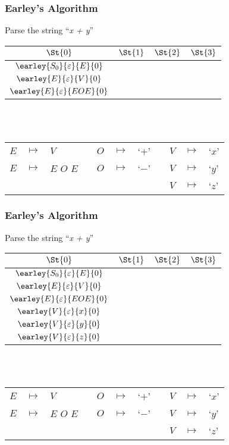 \begin{frame}
	\frametitle{Earley's Algorithm}
	\centering
	Parse the string ``\emph{x + y}''\\
	\vspace{0.5cm}
	\begin{tabular}{|c|c|c|c|}
		\hline
		$\St{0}$ & $\St{1}$ & $\St{2}$ & $\St{3}$ \\
		\hline
		$\earley{S_0}{\varepsilon}{E}{0}$ & & & \\
		$\earley{E}{\varepsilon}{V}{0}$   & & & \\
		$\earley{E}{\varepsilon}{EOE}{0}$ & & & \\
		\hline
	\end{tabular}

	\\~\\
	\vspace{0.5cm}
	\scriptsize
	\begin{tabular}{rclcrclcrcl}
		$E$ & $ \mapsto $ & $V$         && $O$ & $ \mapsto $ & `$+$' && $V$ & $ \mapsto $ & `$x$' \\
		$E$ & $ \mapsto $ & $E$ $O$ $E$ && $O$ & $ \mapsto $ & `$-$' && $V$ & $ \mapsto $ & `$y$' \\
		    &             &             &&     &             &       && $V$ & $ \mapsto $ & `$z$'
	\end{tabular}
\end{frame}

\begin{frame}
	\frametitle{Earley's Algorithm}
	\centering
	Parse the string ``\emph{x + y}''\\
	\vspace{0.5cm}
	\begin{tabular}{|c|c|c|c|}
		\hline
		$\St{0}$                          & $\St{1}$ & $\St{2}$ & $\St{3}$ \\
		\hline
		$\earley{S_0}{\varepsilon}{E}{0}$ & & &\\
		$\earley{E}{\varepsilon}{V}{0}$   & & & \\
		$\earley{E}{\varepsilon}{EOE}{0}$ & & & \\
		$\earley{V}{\varepsilon}{x}{0}$   & & & \\
		$\earley{V}{\varepsilon}{y}{0}$   & & & \\
		$\earley{V}{\varepsilon}{z}{0}$   & & & \\
		\hline
	\end{tabular}

	\\~\\
	\vspace{0.5cm}
	\scriptsize
	\begin{tabular}{rclcrclcrcl}
		$E$ & $ \mapsto $ & $V$         && $O$ & $ \mapsto $ & `$+$' && $V$ & $ \mapsto $ & `$x$' \\
		$E$ & $ \mapsto $ & $E$ $O$ $E$ && $O$ & $ \mapsto $ & `$-$' && $V$ & $ \mapsto $ & `$y$' \\
		    &             &             &&     &             &       && $V$ & $ \mapsto $ & `$z$'
	\end{tabular}
\end{frame}


